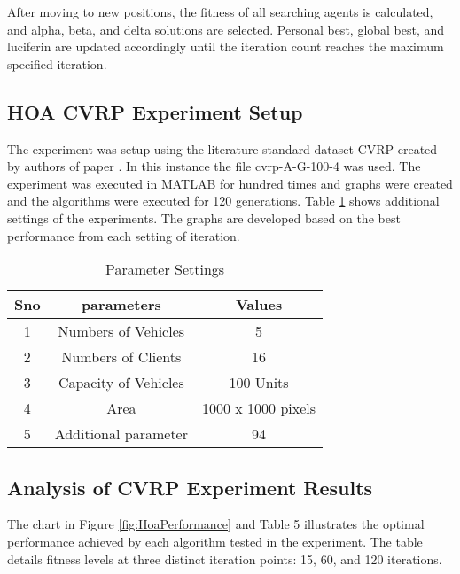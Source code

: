 \documentclass[conference]{IEEEtran}
\begin{document}
\begin{abstract1}
After moving to new positions, the fitness of all searching agents is calculated, and alpha, beta, and delta solutions are selected. Personal best, global best, and luciferin are updated accordingly until the iteration count reaches the maximum specified iteration.



 \subsection{HOA CVRP Experiment Setup}
 
The experiment was setup using the literature standard dataset CVRP created by authors of paper \cite{letchford2019capacitated}. In this instance the file cvrp-A-G-100-4 was used. 
 The experiment was executed in MATLAB for hundred times and graphs were created and the algorithms were executed for 120 generations. Table \ref{tabCVRPPara} shows additional settings of the experiments. The graphs are developed based on the best performance from each setting of iteration.
 
 
 \begin{table}[h]
 	\caption{Parameter Settings}
 
 	\begin{center}
 		\begin{tabular}{|c|c|c|}
 			
 			\hline
 			Sno & parameters &  Values\\ \hline
 			1 & Numbers of Vehicles	 &  5\\ \hline
 			2 & Numbers of Clients	 &  16\\ \hline
 			3 & Capacity of Vehicles	 &  100 Units\\ \hline
 			4 & Area	 & 1000 x 1000 pixels\\ \hline
 			5 & Additional parameter &  94\\ \hline
 			
 			
 		\end{tabular}
 		\label{tabCVRPPara}
 	\end{center}
 \end{table}
 

  \subsection{Analysis of CVRP Experiment Results}
The chart in Figure \ref{fig:HoaPerformance} and Table 5 illustrates the optimal performance achieved by each algorithm tested in the experiment. The table details fitness levels at three distinct iteration points: 15, 60, and 120 iterations.


\end{abstract1}
\end{document}
